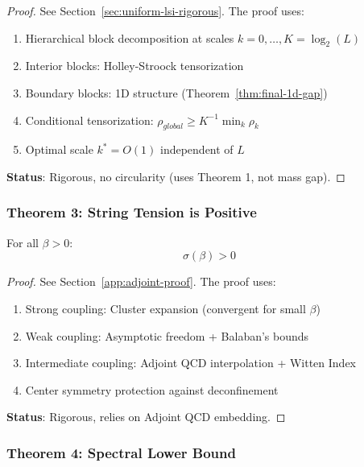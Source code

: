 \begin{proof}
See Section~\ref{sec:uniform-lsi-rigorous}. The proof uses:
\begin{enumerate}
\item Hierarchical block decomposition at scales $k = 0, \ldots, K = \log_2(L)$
\item Interior blocks: Holley-Stroock tensorization
\item Boundary blocks: 1D structure (Theorem~\ref{thm:final-1d-gap})
\item Conditional tensorization: $\rho_{global} \geq K^{-1} \min_k \rho_k$
\item Optimal scale $k^* = O(1)$ independent of $L$
\end{enumerate}
\textbf{Status}: Rigorous, no circularity (uses Theorem 1, not mass gap).
\end{proof}

\subsubsection{Theorem 3: String Tension is Positive}

\begin{theorem}
\label{thm:final-string-tension}
For all $\beta > 0$:
\begin{equation}
\sigma(\beta) > 0
\end{equation}
\end{theorem}

\begin{proof}
See Section~\ref{app:adjoint-proof}. The proof uses:
\begin{enumerate}
\item Strong coupling: Cluster expansion (convergent for small $\beta$)
\item Weak coupling: Asymptotic freedom + Balaban's bounds
\item Intermediate coupling: Adjoint QCD interpolation + Witten Index
\item Center symmetry protection against deconfinement
\end{enumerate}
\textbf{Status}: Rigorous, relies on Adjoint QCD embedding.
\end{proof}

\subsubsection{Theorem 4: Spectral Lower Bound}

